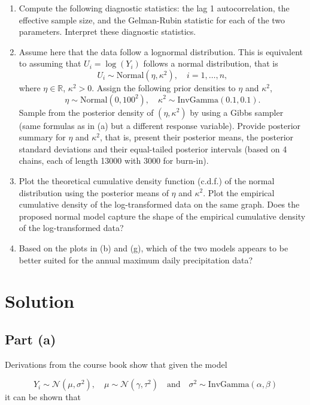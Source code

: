 \documentclass[
]{homework}
\begin{document}
\begin{enumerate}[label = (\alph*)]
  \item Compute the following diagnostic statistics: the lag 1 autocorrelation, the effective sample size, and the Gelman-Rubin statistic for each of the
  two parameters. Interpret these diagnostic statistics.
  
  \item Assume here that the data follow a lognormal distribution. This is equivalent to assuming that $U_i = \log(Y_i)$ follows a normal distribution, that is
  $$
    U_i \sim \mathrm{Normal}(\eta, \kappa^2), \quad i = 1, \ldots, n,
  $$
  where $\eta \in \mathbb R$, $\kappa^2 > 0$. Assign the following prior densities to $\eta$ and $\kappa^2$,
  $$
    \eta \sim \mathrm{Normal}(0, 100^2), \quad \kappa^2 \sim \mathrm{InvGamma}(0.1, 0.1).
  $$
  Sample from the posterior density of $(\eta, \kappa^2)$ by using a Gibbs sampler (same formulas as in (a) but a different response variable). Provide posterior
  summary for $\eta$ and $\kappa^2$, that is, present their posterior means, the posterior standard deviations and their equal-tailed posterior intervals (based
  on 4 chains, each of length 13000 with 3000 for burn-in).
  
  \item Plot the theoretical cumulative density function (c.d.f.) of the normal distribution using the posterior means of $\eta$ and $\kappa^2$. Plot the empirical cumulative
  density of the log-transformed data on the same graph. Does the proposed normal model capture the shape of the empirical cumulative density of the log-transformed data?
  
  \item Based on the plots in (b) and (g), which of the two models appears to be better suited for the annual maximum daily precipitation data?

\end{enumerate}

\newpage

\section{Solution}\label{solution-1}

\subsection{Part (a)}\label{part-a-1}

Derivations from the course book show that given the model

\[
  Y_i \sim \mathcal N(\mu, \sigma^2), \quad \mu \sim \mathcal N(\gamma, \tau^2) \quad \text{and} \quad \sigma^2 \sim \mathrm{InvGamma}(\alpha, \beta)
\]
it can be shown that
\end{document}
